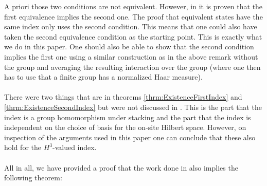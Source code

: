 \documentclass[11pt,a4paper,twoside]{article}
\numberwithin{equation}{section}
\begin{document}
	A priori those two conditions are not equivalent. However, in \cite{ogata2021h3gmathbb} it is proven that the first equivalence implies the second one. The proof that equivalent states have the same index only uses the second condition. This means that one could also have taken the second equivalence condition as the starting point. This is exactly what we do in this paper. One should also be able to show that the second condition implies the first one using a similar construction as in the above remark without the group and averaging the resulting interaction over the group (where one then has to use that a finite group has a normalized Haar measure).\\\\
	There were two things that are in theorems \ref{thrm:ExistenceFirstIndex} and \ref{thrm:ExistenceSecondIndex} but were not discussed in \cite{ogata2021h3gmathbb}. This is the part that the index is a group homomorphism under stacking and the part that the index is independent on the choice of basis for the on-site Hilbert space. However, on inspection of the arguments used in this paper one can conclude that these also hold for the $H^3$-valued index.\\\\
	All in all, we have provided a proof that the work done in \cite{ogata2021h3gmathbb} also implies the following theorem:
\end{document}
